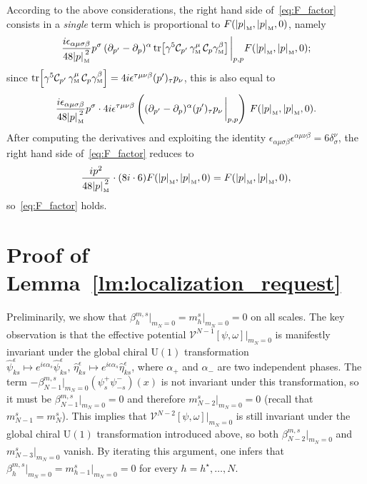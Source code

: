 \documentclass[a4paper, 11pt]{article}
\newcommand{\mnorm}[1]			
	{\abs*{#1}_{\! \scriptscriptstyle \mathrm{M}}}			%
\newcommand{\mink}{{\scriptscriptstyle{\mathrm{M}}}}		%
\newcommand{\mproj}[1]{\mathcal{C}_{#1}}					%
\newcommand{\sing}[2]{{#1}^{#2}}							%
\theoremstyle{thm}
\begin{document}
According to the above considerations, the right hand side of~\eqref{eq:F_factor} consists in a \emph{single} term which is proportional to $F(\mnorm{p}, \mnorm{p}, 0)$, namely
\begin{equation}
\label{eq:F_factor_RHS_surviving}
\frac{i\epsilon_{\alpha \mu \sigma \beta}}{48 \mnorm{p}^2} p^\sigma \, (\partial_{p'} - \partial_p)^\alpha \tr[\gamma^5 \mproj{p'} \, \gamma^\mu_\mink \, \mproj{p} \gamma^\beta_\mink] \eval_{p, p} F(\mnorm{p}, \mnorm{p}, 0);
\end{equation}
since $\tr[\gamma^5 \mproj{p'} \, \gamma^\mu_\mink \, \mproj{p} \gamma^\beta_\mink] = 4i \epsilon^{\tau \mu \nu \beta} (p')_\tau p_\nu$, this is also equal to
\begin{equation}
\frac{i\epsilon_{\alpha \mu \sigma \beta}}{48 \mnorm{p}^2} p^\sigma \cdot 4i \epsilon^{\tau \mu \nu \beta} \left( (\partial_{p'} - \partial_p)^\alpha (p')_\tau p_\nu \eval_{p, p} \right) \,  F(\mnorm{p}, \mnorm{p}, 0).
\end{equation}
After computing the derivatives and exploiting the identity $\epsilon_{\alpha \mu \sigma \beta} \epsilon^{\alpha \mu \nu \beta} = 6 \delta^\nu_\sigma$, the right hand side of~\eqref{eq:F_factor} reduces to
\begin{equation}
\frac{i p^2}{48 \mnorm{p}^2} \cdot (8i \cdot 6) F(\mnorm{p}, \mnorm{p}, 0) = F(\mnorm{p}, \mnorm{p}, 0),
\end{equation}
so~\eqref{eq:F_factor} holds.

\section{Proof of Lemma~\texorpdfstring{\ref{lm:localization_request}}{eq}}
\label{app:localization_request_proof}

Preliminarily, we show that $\beta^{m, s}_h \vert_{m_N = 0} = m^s_h \vert_{m_N = 0} = 0$ on all scales. The key observation is that the effective potential $\sing{\mathscr{V}}{N-1}[\psi, \omega] \vert_{m_N = 0}$ is manifestly invariant under the global chiral $\mathrm{U}(1)$ transformation $\hat{\psi}^\epsilon_{k s} \mapsto e^{i\epsilon \alpha_s} \hat{\psi}^\epsilon_{k s}, \, \hat{\eta}^\epsilon_{k s} \mapsto e^{i \epsilon \alpha_s} \hat{\eta}^\epsilon_{k s}$, where $\alpha_+$ and $\alpha_-$ are two independent phases. The term $-\beta^{m, s}_{N-1} \vert_{m_N = 0} (\psi^+_s \psi^-_{-s})(x)$ is not invariant under this transformation, so it must be $\beta^{m, s}_{N-1} \vert_{m_N = 0} = 0$ and therefore $m^s_{N-2} \vert_{m_N = 0} = 0$ (recall that $m^s_{N-1} = m^s_N$). This implies that $\sing{\mathscr{V}}{N-2}[\psi, \omega] \vert_{m_N = 0}$ is still invariant under the global chiral $\mathrm{U}(1)$ transformation introduced above, so both $\beta^{m, s}_{N-2} \vert_{m_N = 0}$ and $m^s_{N-3} \vert_{m_N = 0}$ vanish. By iterating this argument, one infers that $\beta^{m, s}_h \vert_{m_N = 0} = m^s_{h-1} \vert_{m_N = 0} = 0$ for every $h = h^\star, \dots, N$.
\end{document}

